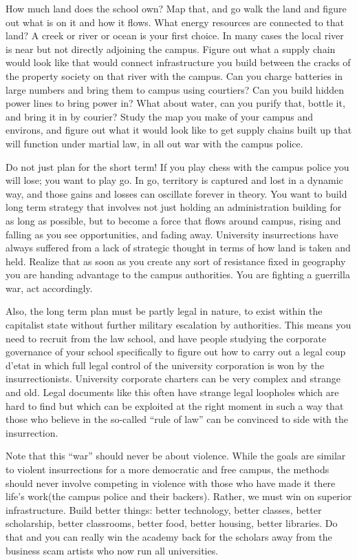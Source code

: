 How much land does the school own? Map that, and go walk the land and
figure out what is on it and how it flows. What energy resources are
connected to that land? A creek or river or ocean is your first choice.
In many cases the local river is near but not directly adjoining the
campus. Figure out what a supply chain would look like that would
connect infrastructure you build between the cracks of the property
society on that river with the campus. Can you charge batteries in large
numbers and bring them to campus using courtiers? Can you build hidden
power lines to bring power in? What about water, can you purify that,
bottle it, and bring it in by courier? Study the map you make of your
campus and environs, and figure out what it would look like to get
supply chains built up that will function under martial law, in all out
war with the campus police.

Do not just plan for the short term! If you play chess with the campus
police you will lose; you want to play go. In go, territory is captured
and lost in a dynamic way, and those gains and losses can oscillate
forever in theory. You want to build long term strategy that involves
not just holding an administration building for as long as possible, but
to become a force that flows around campus, rising and falling as you
see opportunities, and fading away. University insurrections have always
suffered from a lack of strategic thought in terms of how land is taken
and held. Realize that as soon as you create any sort of resistance
fixed in geography you are handing advantage to the campus authorities.
You are fighting a guerrilla war, act accordingly.

Also, the long term plan must be partly legal in nature, to exist within
the capitalist state without further military escalation by authorities.
This means you need to recruit from the law school, and have people
studying the corporate governance of your school specifically to figure
out how to carry out a legal coup d'etat in which full legal control of
the university corporation is won by the insurrectionists. University
corporate charters can be very complex and strange and old. Legal
documents like this often have strange legal loopholes which are hard to
find but which can be exploited at the right moment in such a way that
those who believe in the so-called ``rule of law'' can be convinced to
side with the insurrection.

Note that this ``war'' should never be about violence. While the goals
are similar to violent insurrections for a more democratic and free
campus, the methods should never involve competing in violence with
those who have made it there life's work(the campus police and their
backers). Rather, we must win on superior infrastructure. Build better
things: better technology, better classes, better scholarship, better
classrooms, better food, better housing, better libraries. Do that and
you can really win the academy back for the scholars away from the
business scam artists who now run all universities.

